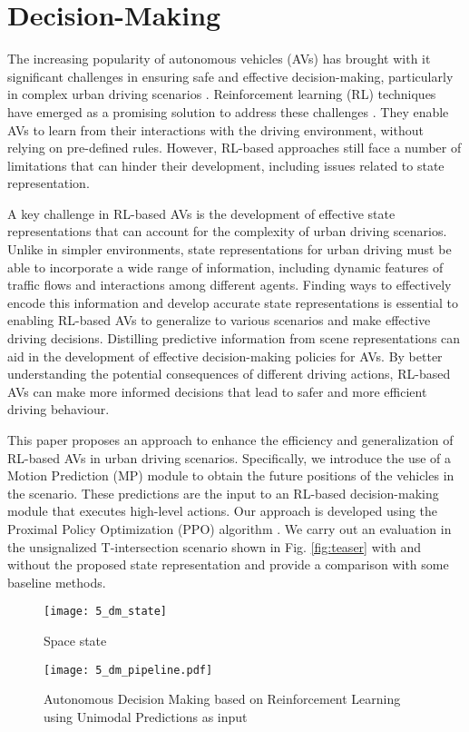
\section{Decision-Making}

The increasing popularity of autonomous vehicles (AVs) has brought with it significant challenges in ensuring safe and effective decision-making, particularly in complex urban driving scenarios \cite{Yurtsever2019}. Reinforcement learning (RL) techniques have emerged as a promising solution to address these challenges \cite{Ravi2020}. They enable AVs to learn from their interactions with the driving environment, without relying on pre-defined rules. However, RL-based approaches still face a number of limitations that can hinder their development, including issues related to state representation.

A key challenge in RL-based AVs is the development of effective state representations that can account for the complexity of urban driving scenarios. Unlike in simpler environments, state representations for urban driving must be able to incorporate a wide range of information, including dynamic features of traffic flows and interactions among different agents. Finding ways to effectively encode this information and develop accurate state representations is essential to enabling RL-based AVs to generalize to various scenarios and make effective driving decisions. Distilling predictive information from scene representations can aid in the development of effective decision-making policies for AVs. By better understanding the potential consequences of different driving actions, RL-based AVs can make more informed decisions that lead to safer and more efficient driving behaviour.

This paper proposes an approach to enhance the efficiency and generalization of RL-based AVs in urban driving scenarios. Specifically, we introduce the use of a Motion Prediction (MP) module to obtain the future positions of the vehicles in the scenario. These predictions are the input to an RL-based decision-making module that executes high-level actions. Our approach is developed using the Proximal Policy Optimization (PPO) algorithm  \cite{Schulman2017}.  We carry out an evaluation in the unsignalized T-intersection scenario shown in Fig. \ref{fig:teaser} with and without the proposed state representation and provide a comparison with some baseline methods.

\begin{figure*}[ht]
	\centering
	\begin{subfigure}{0.4\textwidth}
		\texttt{[image: 5\_dm\_state]}
		\caption{Space state}
	\end{subfigure}
	\hfill
	\begin{subfigure}{0.5\textwidth}
		\texttt{[image: 5\_dm\_pipeline.pdf]}
		\caption{Autonomous Decision Making based on Reinforcement Learning using Unimodal Predictions as input}
	\end{subfigure}
	
	\label{fig:5_decision_making}
\end{figure*}

